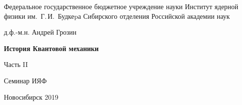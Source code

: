 \documentclass[12pt,pagesize,paper=landscape,paper=192mm:108mm]{scrbook}
\begin{document}
\begin{titlepage}
  \vspace*{-0.5em}
  \begin{center}    
    \hspace*{3em}
     Федеральное государственное бюджетное учреждение науки Институт ядерной физики им.~Г.\,И.~Будкеpа Сибирского отделения Российской академии наук
    
    \vfill

    \Large
    д.ф.-м.н. Андрей Грозин
    
    \bigskip

    \huge
    \textbf{История Квантовой механики}

    Часть II
    \vfill

    \Large
    Семинар ИЯФ 
    \vfill

    \normalsize

    \normalsize \ccbysa\hspace{0.5em}  Новосибирск 2019
  \end{center}
\end{titlepage}
\end{document}
